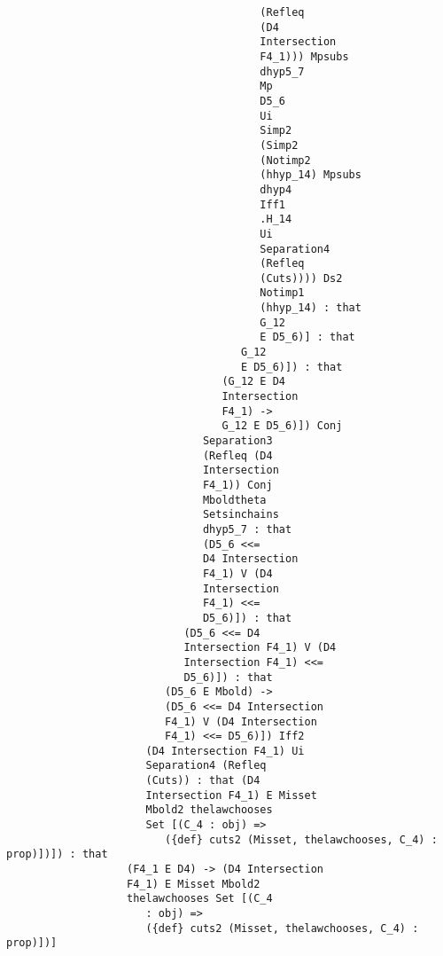 \documentclass[12pt]{article}
\begin{document}
\begin{verbatim}
                                        (Refleq 
                                        (D4 
                                        Intersection 
                                        F4_1))) Mpsubs 
                                        dhyp5_7 
                                        Mp 
                                        D5_6 
                                        Ui 
                                        Simp2 
                                        (Simp2 
                                        (Notimp2 
                                        (hhyp_14) Mpsubs 
                                        dhyp4 
                                        Iff1 
                                        .H_14 
                                        Ui 
                                        Separation4 
                                        (Refleq 
                                        (Cuts)))) Ds2 
                                        Notimp1 
                                        (hhyp_14) : that 
                                        G_12 
                                        E D5_6)] : that 
                                     G_12 
                                     E D5_6)]) : that 
                                  (G_12 E D4 
                                  Intersection 
                                  F4_1) -> 
                                  G_12 E D5_6)]) Conj 
                               Separation3 
                               (Refleq (D4 
                               Intersection 
                               F4_1)) Conj 
                               Mboldtheta 
                               Setsinchains 
                               dhyp5_7 : that 
                               (D5_6 <<= 
                               D4 Intersection 
                               F4_1) V (D4 
                               Intersection 
                               F4_1) <<= 
                               D5_6)]) : that 
                            (D5_6 <<= D4 
                            Intersection F4_1) V (D4 
                            Intersection F4_1) <<= 
                            D5_6)]) : that 
                         (D5_6 E Mbold) -> 
                         (D5_6 <<= D4 Intersection 
                         F4_1) V (D4 Intersection 
                         F4_1) <<= D5_6)]) Iff2 
                      (D4 Intersection F4_1) Ui 
                      Separation4 (Refleq 
                      (Cuts)) : that (D4 
                      Intersection F4_1) E Misset 
                      Mbold2 thelawchooses 
                      Set [(C_4 : obj) => 
                         ({def} cuts2 (Misset, thelawchooses, C_4) : prop)])]) : that 
                   (F4_1 E D4) -> (D4 Intersection 
                   F4_1) E Misset Mbold2 
                   thelawchooses Set [(C_4 
                      : obj) => 
                      ({def} cuts2 (Misset, thelawchooses, C_4) : prop)])]



\end{verbatim}
\end{document}
